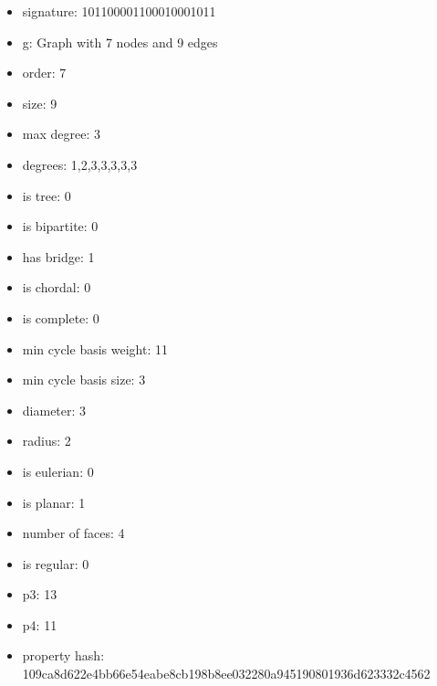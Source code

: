 \begin{itemize}
\item signature: 101100001100010001011
\item g: Graph with 7 nodes and 9 edges
\item order: 7
\item size: 9
\item max degree: 3
\item degrees: 1,2,3,3,3,3,3
\item is tree: 0
\item is bipartite: 0
\item has bridge: 1
\item is chordal: 0
\item is complete: 0
\item min cycle basis weight: 11
\item min cycle basis size: 3
\item diameter: 3
\item radius: 2
\item is eulerian: 0
\item is planar: 1
\item number of faces: 4
\item is regular: 0
\item p3: 13
\item p4: 11
\item property hash: 109ca8d622e4bb66e54eabe8cb198b8ee032280a945190801936d623332c4562
\end{itemize}
\newpage
\begin{figure}
\end{figure}
